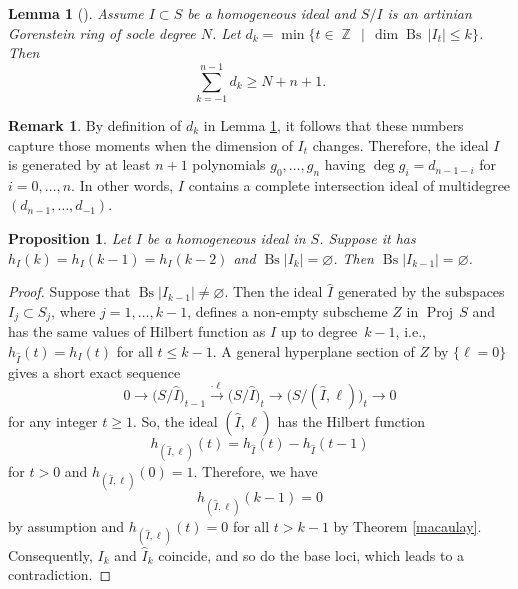 \documentclass[a4paper,11pt,english,german]{amsart}
\DeclareMathOperator{\Z}{\mathbb{Z}}
\DeclareMathOperator{\Bs}{Bs}
\DeclareMathOperator{\Proj}{Proj}
\newtheorem{lem}[thm]{Lemma}
\newtheorem{prop}[thm]{Proposition}
\theoremstyle{definition}
\newtheorem{remark}[thm]{Remark}
\begin{document}
 \begin{lem}[{\cite[Lemma 5.2]{kloosterman2022maximal}}] \label{technical_lemma}
 Assume $I \subset S$ be a homogeneous ideal and	$S/I$ is an artinian Gorenstein ring of socle degree $N$. Let $d_k=\min\{t\in \Z \, \mid \,\dim\Bs\, |I_t|\leqslant k\}$. Then 
 \begin{equation*}
 	\sum\limits_{k=-1}^{n-1}d_k\geqslant N+n+1.
 \end{equation*}
 \end{lem}
 \begin{remark}\label{ci_ideal_inside_ag_ideal}
 	By definition of $d_k$ in Lemma \ref{technical_lemma}, it follows that these numbers capture those moments when the dimension of $I_t$ changes. Therefore, the ideal $I$ is generated by at least $n+1$ polynomials $g_0,\dots,g_n$ having $\deg g_i=d_{n-1-i}$ for $i=0,\dots,n$. In other words, $I$ contains a complete intersection ideal of multidegree $(d_{n-1},\dots,d_{-1})$.
 \end{remark}
 
 
\begin{prop}\label{new}
Let $I$ be a homogeneous ideal in $S$. Suppose it has $h_I(k)=h_I(k-1)=h_I(k-2)$ and $\Bs|I_k|=\varnothing$. Then $\Bs|I_{k-1}|=\varnothing$.
	\end{prop}
\begin{proof}
Suppose that $\Bs|I_{k-1}|\neq \varnothing$. Then the ideal $\widehat{I}$ generated by the subspaces $I_j \subset S_j$, where $j=1,\dots,k-1$, 
defines a non-empty subscheme $Z$ in $\Proj\, S$ and has the same values of Hilbert function as $I$ up to degree~$k-1$, i.e., $h_{\widehat{I}}(t)=h_I(t)$ for all $t\leqslant k-1$. A general hyperplane section of $Z$ by $\{\ell=0\}$ gives a short exact sequence
\begin{equation}\tag{4.1}
	0\to \big(S/\widehat{I}\big)_{t-1} \xrightarrow{\cdot \ell} \big(S/\widehat{I}\big)_{t}\to \big(S/(\widehat{I},\ell)\big)_{t}\to 0 \label{short_exact_sequence}
\end{equation}
for any integer $t\geqslant 1$. So, the ideal $(\widehat{I},\ell)$ has the Hilbert function 
\begin{equation*}
	h_{(\widehat{I},\ell)}(t)=h_{\widehat{I}}(t)-h_{\widehat{I}}(t-1)
\end{equation*}
for $t>0$ and $h_{(\widehat{I},\ell)}(0)=1$. Therefore, we have 
$$h_{(\widehat{I},\ell)}(k-1)=0$$
by assumption and $h_{(\widehat{I},\ell)}(t)=0$ for all $t>k-1$ by Theorem \ref{macaulay}. Consequently, $I_{k}$ and $\widehat{I}_k$ coincide, and so do the base loci, which leads to a contradiction.
\end{proof}
\end{document}
